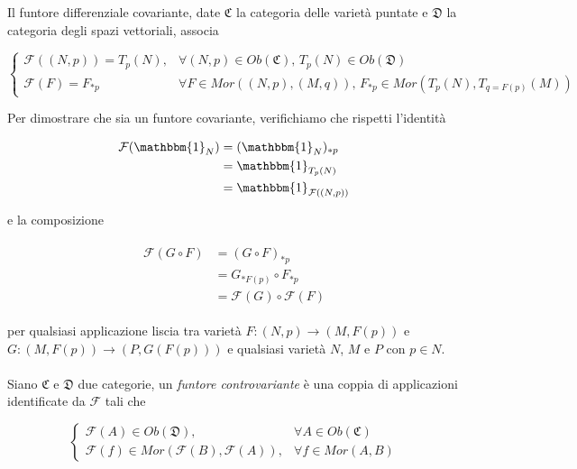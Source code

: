 Il funtore differenziale covariante, date $ \mathfrak{C} $ la categoria delle varietà puntate e $ \mathfrak{D} $ la categoria degli spazi vettoriali, associa

\begin{equation}
	\begin{cases}
		\mathcal{F}((N,p)) = T_{p}(N), & \forall (N,p) \in Ob(\mathfrak{C}), \, T_{p}(N) \in Ob(\mathfrak{D})\\
		\mathcal{F}(F) = F_{*p} & \forall F \in Mor((N,p),(M,q)), \, F_{*p} \in Mor(T_{p}(N),T_{q=F(p)}(M))
	\end{cases}
\end{equation}

Per dimostrare che sia un funtore covariante, verifichiamo che rispetti l'identità

\begin{align}
	\begin{split}
		\mathcal{F}(\mathbbm{1}_{N}) &= (\mathbbm{1}_{N})_{*p}\\
		&= \mathbbm{1}_{T_{p}(N)}\\
		&= \mathbbm{1}_{\mathcal{F}((N,p))}
	\end{split}
\end{align}

e la composizione

\begin{align}
	\begin{split}
		\mathcal{F}(G \circ F) &= (G \circ F)_{*p}\\
		&= G_{*F(p)} \circ F_{*p}\\
		&= \mathcal{F}(G) \circ \mathcal{F}(F)
	\end{split}
\end{align}

per qualsiasi applicazione liscia tra varietà $ F : (N,p) \to (M,F(p)) $ e $ G : (M,F(p)) \to (P,G(F(p))) $ e qualsiasi varietà $ N $, $ M $ e $ P $ con $ p \in N $.\\\\
%
Siano $ \mathfrak{C} $ e $ \mathfrak{D} $ due categorie, un \textit{funtore controvariante} è una coppia di applicazioni identificate da $ \mathcal{F} $ tali che

\begin{equation}
	\begin{cases}
		\mathcal{F}(A) \in Ob(\mathfrak{D}), & \forall A \in Ob(\mathfrak{C})\\
		\mathcal{F}(f) \in Mor(\mathcal{F}(B),\mathcal{F}(A)), & \forall f \in Mor(A,B)
	\end{cases}
\end{equation}

